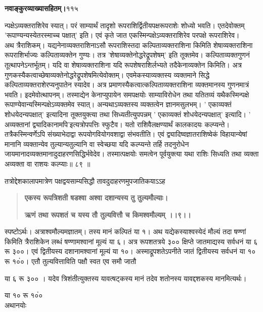 \documentclass[11pt, openany]{book}
\begin{document}
\onehalfspacing
\hspace{2in}\textbf{नवाङ्कुरव्याख्यासहितम्।}\hspace{2in}११५

\vspace{5mm}

\begin{sloppypar}
\hangindent=0.2in न्पक्षेऽव्यक्तराशिरेव स्यात्। परं साम्यार्थं तादृशो रूपराशिर्द्वितीयपक्षरूपराशेः शोध्यो भवति। एतदेवोक्तम् 'रूपाण्यन्यस्येतरस्माच्च पक्षात्' इति। एवं कृते जात एकस्मिन्पक्षेऽव्यक्तराशिरेव परपक्षे रूपराशिरेव।\\

\hangindent=0.2in \hspace{0.2in}अथ त्रैराशिकम्। यद्यनेनाव्यक्तराशिनाऽसौ रूपराशिस्तदा कल्पिताव्यक्तराशिना किमिति शेषाव्यक्तराशिना रूपराशिर्भाज्यः कल्पिताव्यक्तेन गुण्यः। तत्र 'शेषाव्यक्तेनोद्धरेद्रूपशेषम्' इति तूक्तमेव। कल्पिताव्यक्तगुणनं तूत्थापनेऽन्तर्भूतम्। यदि वा शेषाव्यक्तराशिना यदि रूपशेषराशिर्लभ्यते तदैकेनाव्यक्तेन किमिति। अत्र गुणकस्यैकत्वाच्छेषाव्यक्तेनोद्धरेद्रूपशेषमित्येवोक्तम्। एवमेकस्याव्यक्तस्य व्यक्तमाने सिद्धे कल्पिताव्यक्तराशेरप्यनुपातेन स्यादेव। अत्र प्रमाणस्यैकत्वात्कल्पिताव्यक्तराशिना व्यक्तमानस्य गुणनमात्रं भवति। इदमेवोत्थापनम्। तस्माद्येन केनाप्युपायेन समपक्षयोः साम्याविरोधेन तथा यतितव्यं यथैकस्मिन्पक्षे रूपाण्येवान्यस्मिन्पक्षेऽव्यक्तमेव स्यात्। अन्यथाऽव्यक्तस्य व्यक्तत्वेन ज्ञानमसुलभम्। ' एकाव्यक्तं शोधयेदन्यपक्षात्' इत्यादिना तूक्तयुक्त्या तथा सिध्यतीत्युपपन्नम् ' एकाव्यक्तं शोधयेदन्यपक्षात्' इत्यादि। ' अव्यक्तानां द्व्यादिकानामपि'इत्यत्रोपपत्तिः स्फुटैव। यतो राशिवैलक्षण्यार्थं कालकादयः कल्प्यन्ते। तत्रैकस्मिन्वर्णेऽपि संख्याभेदाद्वा रूपयोगवियोगवशाद्वा संभवतीति। एवं द्व्यादिष्वज्ञातराशिष्वेकं विहायान्येषां मानानि व्यक्तान्येव तुल्यान्यतुल्यानि वा स्वेच्छया यदि कल्प्यन्ते तर्हि तदनुरोधेन जायमानादव्यक्तमानादुदाहरणसिद्धिर्भवेदेव। तस्मात्पक्षयोः समत्वेन पूर्वयुक्त्या यथा राशिः सिध्यति तथा व्यक्ता अव्यक्ता वा राशयः कल्प्याः॥ ८९ ॥

\hangindent=0.2in \hspace{0.2in}तत्रोद्देशकालापमात्रेण पक्षद्वयसाम्यसिद्धौ तावदुदाहरणमुपजातिकयाऽऽह\textendash

\begin{quote}
\hspace{0.5in}\textbf{एकस्य रूपत्रिशती षडश्वा अश्वा दशान्यस्य तु तुल्यमौल्याः।}

\hspace{0.5in}\textbf{ऋणं तथा रूपशतं च यस्य तौ तुल्यवित्तौ च किमश्वमौल्यम् ।।९।।}
\end{quote}

\hangindent=0.2in \hspace{0.2in}स्पष्टोऽर्थः। अत्राश्वमौल्यमज्ञातम्। तस्य मानं कल्पितं या १। अथ यद्येकस्याश्वस्येदं मौल्यं तदा षण्णां किमिति त्रैराशिकेन लब्धं षण्णामश्वानां मूल्यं या ६। अत्र रूपशतत्रये ३०० क्षिप्ते जातमाद्यस्य सर्वधनं या ६ रू ३००। एवं द्वितीयस्य दशानामश्वानां मूल्यं या १०। अस्माद्रूपशतेऽपनीते जातं द्वितीयस्य सर्वधनं या १० रू १०ं०। एतौ तुल्यवित्ताविति पक्षौ स्वत एव समौ जातौ

या ६ रू ३०० । यदेव त्रिशंतीत्युक्तस्य यावत्षट्कस्य मानं तदेव शतोनस्य यावद्दशकस्य मानमित्यर्थः। 

या १० रू १०ं०\\

अथानयोः
\end{sloppypar}
\end{document}
